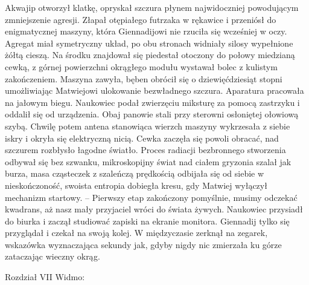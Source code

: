 \documentclass[../MAIN.tex]{subfiles}
\begin{document}
Akwajip otworzył klatkę, opryskał szczura płynem najwidoczniej powodującym zmniejszenie agresji. Złapał otępiałego futrzaka w rękawice i przeniósł do enigmatycznej maszyny, która Giennadijowi nie rzuciła się wcześniej w oczy. Agregat miał symetryczny układ, po obu stronach widniały silosy wypełnione żółtą cieszą. Na środku znajdował się piedestał otoczony do połowy miedzianą cewką, z górnej powierzchni okrągłego modułu wystawał bolec z kulistym zakończeniem. Maszyna zawyła, bęben obrócił się o dziewięćdziesiąt stopni umożliwiając Matwiejowi ulokowanie bezwładnego szczura. Aparatura pracowała na jałowym biegu. Naukowiec podał zwierzęciu miksturę za pomocą zastrzyku i oddalił się od urządzenia. Obaj panowie stali przy sterowni osłoniętej ołowiową szybą. Chwilę potem antena stanowiąca wierzch maszyny wykrzesała z siebie iskry i okryła się elektryczną nicią. Cewka zaczęła się powoli obracać, nad szczurem rozbłysło łagodne światło. Proces radiacji bezbronnego stworzenia odbywał się bez szwanku, mikroskopijny świat nad ciałem gryzonia szalał jak burza, masa cząsteczek z szaleńczą prędkością odbijała się od siebie w nieskończoność, swoista entropia dobiegła kresu, gdy Matwiej wyłączył mechanizm startowy. 
-- Pierwszy etap zakończony pomyślnie, musimy odczekać kwadrans, aż nasz mały przyjaciel wróci do świata żywych. 
Naukowiec przysiadł do biurka i zaczął studiować zapiski na ekranie monitora. Giennadij tylko się przyglądał i czekał na swoją kolej. W międzyczasie zerknął na zegarek, wskazówka wyznaczająca sekundy jak, gdyby nigdy nic zmierzała ku górze zataczając wieczny okrąg.


Rozdział VII
Widmo:  
\end{document}

